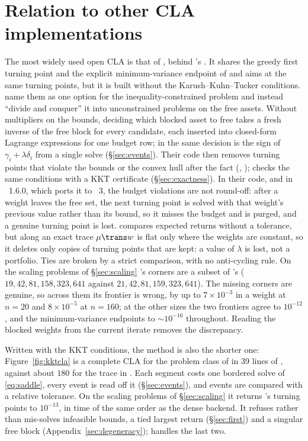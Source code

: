 \section[Relation to other CLA implementations]{Relation to other CLA implementations}
\label{sec:baileydetail}

The most widely used open CLA is that of \citet{bailey2013}, behind
's . It shares the greedy first turning point and the
explicit minimum-variance endpoint of  and aims at the same turning points,
but it is built without the Karush--Kuhn--Tucker conditions. \citet[p.~173]{bailey2013}
name them as one option for the inequality-constrained problem and instead ``divide and
conquer'' it into unconstrained problems on the free assets. Without multipliers on the
bounds, deciding which blocked asset to free takes a fresh inverse of the free block for
every candidate, each inserted into closed-form Lagrange expressions for one budget row;
in  the same decision is the sign of $\gamma_i + \lambda\delta_i$ from a single
solve (\S\ref{sec:events}). Their code then removes turning points that violate the
bounds or the convex hull after the fact (, );
 checks the same conditions with a KKT certificate (\S\ref{sec:exactness}).
In their code, and in ~1.6.0, which ports it to ~3,
the budget violations are not round-off: after a weight leaves the free set, the next
turning point is solved with that weight's previous value rather than its bound, so it
misses the budget and is purged, and a genuine turning point is lost. 
compares expected returns without a tolerance, but along an exact trace $\mu\trans w$ is
flat only where the weights are constant, so it deletes only copies of turning points
that are kept: a value of $\lambda$ is lost, not a portfolio.
Ties are broken by a strict comparison, with no anti-cycling rule. On the scaling problems of \S\ref{sec:scaling}
's corners are a subset of 's
($19, 42, 81, 158, 323, 641$ against $21, 42, 81, 159, 323, 641$). The missing corners are
genuine, so across them its frontier is wrong, by up to $7\times10^{-3}$ in a weight at
$n=20$ and $8\times10^{-5}$ at $n=160$; at the other sizes the two frontiers agree to
$10^{-12}$, and the minimum-variance endpoints to $\sim\!10^{-16}$ throughout. Reading the
blocked weights from the current iterate removes the discrepancy.

Written with the KKT conditions, the method is also the shorter one:
Figure~\ref{fig:kktcla} is a complete CLA for the problem class of \citet{bailey2013} in
39 lines of , against about $180$ for the trace in . Each
segment costs one bordered solve of \eqref{eq:saddle}, every event is read off it
(\S\ref{sec:events}), and events are compared with a relative tolerance. On the scaling
problems of \S\ref{sec:scaling} it returns 's turning points to $10^{-13}$, in
time of the same order as the dense backend. It refuses rather than mis-solves infeasible
bounds, a tied largest return (\S\ref{sec:first}) and a singular free block
(Appendix~\ref{sec:degeneracy});  handles the last two.

